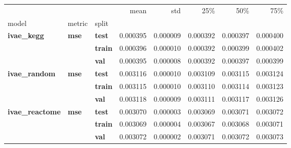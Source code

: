 \begin{tabular}{lllrrrrr}
\toprule
 &  &  & mean & std & 25\% & 50\% & 75\% \\
model & metric & split &  &  &  &  &  \\
\midrule
\multirow[t]{3}{*}{\textbf{ivae\_kegg}} & \multirow[t]{3}{*}{\textbf{mse}} & \textbf{test} & 0.000395 & 0.000009 & 0.000392 & 0.000397 & 0.000400 \\
\textbf{} & \textbf{} & \textbf{train} & 0.000396 & 0.000010 & 0.000392 & 0.000399 & 0.000402 \\
\textbf{} & \textbf{} & \textbf{val} & 0.000395 & 0.000008 & 0.000392 & 0.000397 & 0.000399 \\
\cline{1-8} \cline{2-8}
\multirow[t]{3}{*}{\textbf{ivae\_random}} & \multirow[t]{3}{*}{\textbf{mse}} & \textbf{test} & 0.003116 & 0.000010 & 0.003109 & 0.003115 & 0.003124 \\
\textbf{} & \textbf{} & \textbf{train} & 0.003115 & 0.000010 & 0.003110 & 0.003114 & 0.003123 \\
\textbf{} & \textbf{} & \textbf{val} & 0.003118 & 0.000009 & 0.003111 & 0.003117 & 0.003126 \\
\cline{1-8} \cline{2-8}
\multirow[t]{3}{*}{\textbf{ivae\_reactome}} & \multirow[t]{3}{*}{\textbf{mse}} & \textbf{test} & 0.003070 & 0.000003 & 0.003069 & 0.003071 & 0.003072 \\
\textbf{} & \textbf{} & \textbf{train} & 0.003069 & 0.000004 & 0.003067 & 0.003068 & 0.003071 \\
\textbf{} & \textbf{} & \textbf{val} & 0.003072 & 0.000002 & 0.003071 & 0.003072 & 0.003073 \\
\cline{1-8} \cline{2-8}
\bottomrule
\end{tabular}
